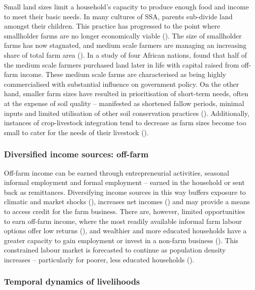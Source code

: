 Small land sizes limit a household's capacity to produce enough food and income to meet their basic needs. In many cultures of SSA, parents sub-divide land amongst their children. This practice has progressed to the point where smallholder farms are no longer economically viable (\citealp{Lowder201616, Jayne2014}). The size of smallholder farms has now stagnated, and medium scale farmers are managing an increasing share of total farm area (\citealp{AnderssonDjurfeldt2018a, Jayne2016}). In a study of four African nations, \citet{Jayne2016} found that half of the medium scale farmers purchased land later in life with capital raised from off-farm income. These medium scale farms are characterised as being highly commercialised with substantial influence on government policy. On the other hand, smaller farm sizes have resulted in prioritisation of short-term needs, often at the expense of soil quality -- manifested as shortened fallow periods, minimal inputs and limited utilisation of other soil conservation practices (\citealp{Tittonell2013}). Additionally, instances of crop-livestock integration tend to decrease as farm sizes become too small to cater for the needs of their livestock (\citealp{Thornton2015}).

\subsubsection{Diversified income sources: off-farm}

Off-farm income can be earned through entrepreneurial activities, seasonal informal employment and formal employment -- earned in the household or sent back as remittances. Diversifying income sources in this way buffers exposure to climatic and market shocks (\citealp{Silvestri2015}), increases net incomes (\citealp{AnderssonDjurfeldt2018}) and may provide a means to access credit for the farm business. There are, however, limited opportunities to earn off-farm income, where the most readily available informal farm labour options offer low returns (\citealp{Jayne2014}), and wealthier and more educated households have a greater capacity to gain employment or invest in a non-farm business (\citealp{Davis2010, Haggblade2010, Reardon1992}). This constrained labour market is forecasted to continue as population density increases -- particularly for poorer, less educated households (\citealp{FAO2015a, deBrauw201433}).

\subsubsection{Temporal dynamics of livelihoods}


